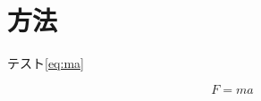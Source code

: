 \documentclass[../../../main]{subfiles}
\begin{document}
\section{方法}

テスト\ref{eq:ma}

\begin{equation}\label{eq:ma}
	F = ma
\end{equation}
\end{document}

